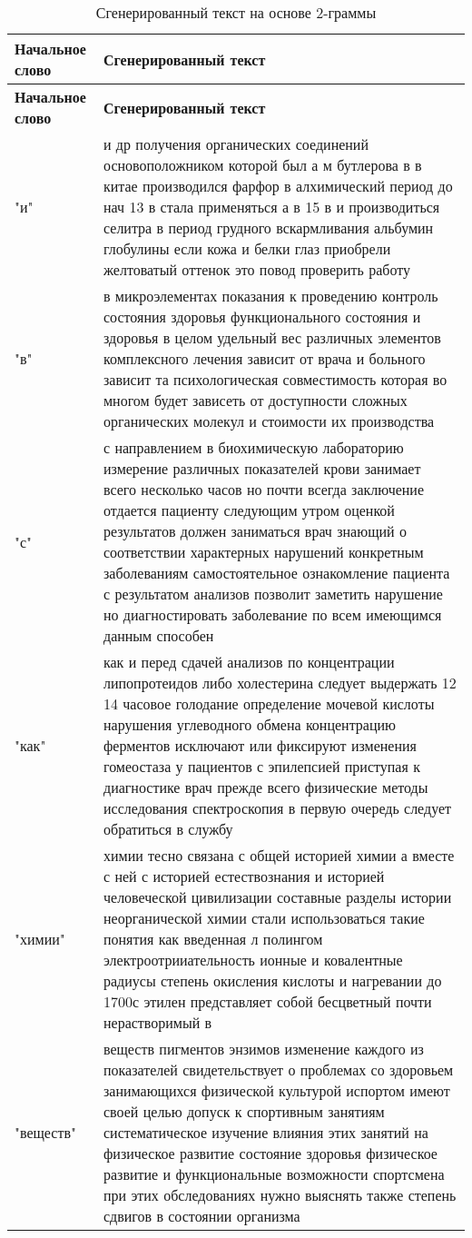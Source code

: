 \begin{longtable}{|p{4cm}|p{12cm}|}
    \caption{Сгенерированный текст на основе 2-граммы} \\

    \hline
    \textbf{Начальное слово} & \textbf{Сгенерированный текст} \\ \hline
    \endfirsthead

    \hline
    \textbf{Начальное слово} & \textbf{Сгенерированный текст} \\ \hline
    \endhead

    \hline
    \endfoot
    "и" & и др получения органических соединений основоположником которой был а м бутлерова в в китае производился фарфор в алхимический период до нач 13 в стала применяться а в 15 в и производиться селитра в период грудного вскармливания альбумин глобулины если кожа и белки глаз приобрели желтоватый оттенок это повод проверить работу \\ \hline
    "в" & в микроэлементах показания к проведению контроль состояния здоровья функционального состояния и здоровья в целом удельный вес различных элементов комплексного лечения зависит от врача и больного зависит та психологическая совместимость которая во многом будет зависеть от доступности сложных органических молекул и стоимости их производства \\ \hline
    "с" & с направлением в биохимическую лабораторию измерение различных показателей крови занимает всего несколько часов но почти всегда заключение отдается пациенту следующим утром оценкой результатов должен заниматься врач знающий о соответствии характерных нарушений конкретным заболеваниям самостоятельное ознакомление пациента с результатом анализов позволит заметить нарушение но диагностировать заболевание по всем имеющимся данным способен \\ \hline
    "как" & как и перед сдачей анализов по концентрации липопротеидов либо холестерина следует выдержать 12 14 часовое голодание определение мочевой кислоты нарушения углеводного обмена концентрацию ферментов исключают или фиксируют изменения гомеостаза у пациентов с эпилепсией приступая к диагностике врач прежде всего физические методы исследования спектроскопия в первую очередь следует обратиться в службу \\ \hline
    "химии" & химии тесно связана с общей историей химии а вместе с ней с историей естествознания и историей человеческой цивилизации составные разделы истории неорганической химии стали использоваться такие понятия как введенная л полингом электроотрииательность ионные и ковалентные радиусы степень окисления кислоты и нагревании до 1700с этилен представляет собой бесцветный почти нерастворимый в \\ \hline
    "веществ" & веществ пигментов энзимов изменение каждого из показателей свидетельствует о проблемах со здоровьем занимающихся физической культурой испортом имеют своей целью допуск к спортивным занятиям систематическое изучение влияния этих занятий на физическое развитие состояние здоровья физическое развитие и функциональные возможности спортсмена при этих обследованиях нужно выяснять также степень сдвигов в состоянии организма \\ \hline
\end{longtable}

